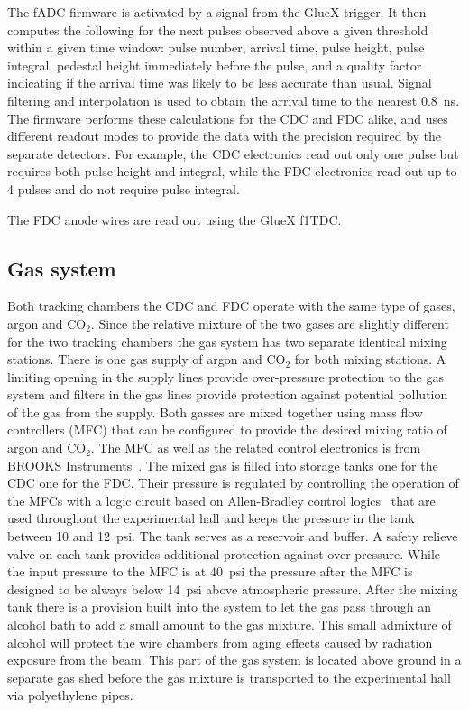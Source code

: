 The fADC firmware is activated by a signal from the GlueX trigger. It then computes the following for the next pulses observed above a given threshold within a given time window: pulse number, arrival time, pulse height, pulse integral, pedestal height immediately before the pulse, and a quality factor indicating if the arrival time was likely to be less accurate than usual. 
Signal filtering and interpolation is used to obtain the arrival time to the nearest 0.8~ns. 
The firmware performs these calculations for the CDC and FDC alike, and uses different readout modes to provide the data with the precision required by the separate detectors. 
For example, the CDC electronics read out only one pulse but requires both pulse height and integral, while the FDC electronics read out up to 4 pulses and do not require pulse integral.  


The FDC anode wires are read out using the GlueX f1TDC\cite{JLAB2002}. 



\subsection[Gas system (Beni)]{Gas system \label{sec:gas}}
Both tracking chambers the CDC and FDC operate with the same type of gases, argon and CO$_{2}$. Since the relative mixture of
the two gases are slightly different for the two tracking chambers the gas system has two separate identical mixing stations. There is one gas supply of argon and CO$_{2}$ for both mixing stations. A limiting opening in the supply
lines provide over-pressure protection to the gas system and filters in the gas lines provide protection against potential
pollution of the gas from the supply. Both gasses are mixed together using mass flow controllers (MFC) that can be 
configured
to provide the desired mixing ratio of argon and CO$_{2}$.  The MFC as well as the related control electronics is from
BROOKS Instruments~\cite{BrooksInst}.
The mixed gas is filled into storage tanks one for the CDC one for the FDC. Their pressure is
regulated by controlling the operation of the MFCs with a logic circuit based on Allen-Bradley control logics~\cite{AllenBradley} 
that are used throughout the experimental hall and keeps
the pressure in the tank between 10 and 12~psi. The tank serves as a reservoir and buffer.
A safety relieve valve on each tank
provides additional protection against over pressure. While the input pressure to the MFC is at 40~psi the pressure after
the MFC is designed to be always below 14~psi above atmospheric pressure. After the mixing tank there is a provision
built into the system to let the gas pass through an alcohol bath to add a small amount to the gas mixture.
This small admixture of alcohol will protect the wire chambers from aging effects caused by radiation exposure from the beam.
This part of the gas system is located above ground in a separate gas shed before the gas mixture is transported
to the experimental hall via polyethylene pipes.

